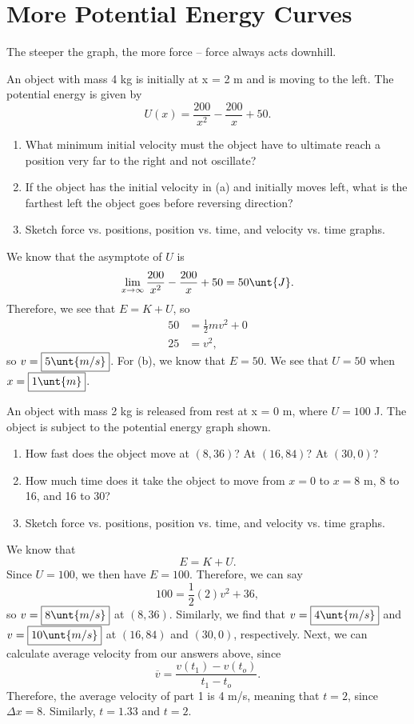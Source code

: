 \documentclass[11pt]{article}
\begin{document}
\section{More Potential Energy Curves}
The steeper the graph, the more force -- force always acts downhill.
\begin{example}
	An object with mass 4 kg is initially at x = 2 m and is moving to the left. The potential energy is given by
	\[U(x) = \frac{200}{x^2} - \frac{200}{x} + 50.\]
	\begin{enumerate}[label=(\alph*)]
		\item What minimum initial velocity must the object have to ultimate reach a position very far to the right and not oscillate?
		\item If the object has the initial velocity in (a) and initially moves left, what is the farthest left the object goes before reversing direction?
		\item Sketch force vs. positions, position vs. time, and velocity vs. time graphs.
	\end{enumerate}
\end{example}
\begin{solution}
	We know that the asymptote of $U$ is
	\[\lim_{x\to \infty} \frac{200}{x^2} - \frac{200}{x} + 50 = 50\unt{J}.\]
	Therefore, we see that $E = K + U$, so
	\begin{align*}
		50 &= \frac{1}{2}mv^2 + 0 \\
		25 &= v^2,
	\end{align*}
	so $v = \boxed{5\unt{m/s}}$. For (b), we know that $E = 50$. We see that $U = 50$ when $x= \boxed{1\unt{m}}$. 
\end{solution}

\begin{example}
	An object with mass 2 kg is released from rest at x = 0 m, where $U = 100$ J. The object is subject to the potential energy graph shown.
	\begin{enumerate}[label=(\alph*)]
		\item How fast does the object move at $(8,36)$? At $(16,84)$? At $(30,0)$?
		\item How much time does it take the object to move from $x= 0 $ to $x=8$ m, $8$ to 16, and 16 to 30?
		\item Sketch force vs. positions, position vs. time, and velocity vs. time graphs.
	\end{enumerate}
\end{example}

\begin{solution}
	We know that
	\[E = K + U.\]
	Since $U = 100$, we then have $E = 100$. Therefore, we can say
	\[100 = \frac{1}{2}(2)v^2 + 36,\]
	so $v = \boxed{8\unt{m/s}}$ at $(8,36)$. Similarly, we find that $v = \boxed{4\unt{m/s}}$ and $v = \boxed{10\unt{m/s}}$ at $(16,84)$ and $(30,0)$, respectively. Next, we can calculate average velocity from our answers above, since
	\[\overline{v} = \frac{v(t_1)-v(t_o)}{t_1-t_o}.\]
	Therefore, the average velocity of part 1 is 4 m/s, meaning that $t = 2$, since $\Delta x = 8$. Similarly, $t = 1.33$ and $t =2$.
\end{solution}
\end{document}
